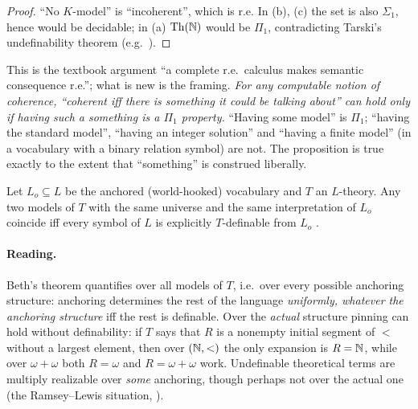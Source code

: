 \begin{proof}
``No $K$-model'' is ``incoherent'', which is r.e. In (b), (c) the set is also $\Sigma_1$, hence would be decidable; in (a) $\mathrm{Th}(\mathbb{N})$ would be $\Pi_1$, contradicting Tarski's undefinability theorem (e.g.\ \citealt{boolos2007computability}).
\end{proof}

This is the textbook argument ``a complete r.e.\ calculus makes semantic consequence r.e.''; what is new is the framing. \emph{For any computable notion of coherence, ``coherent iff there is something it could be talking about'' can hold only if having such a something is a $\Pi_1$ property.} ``Having some model'' is $\Pi_1$; ``having the standard model'', ``having an integer solution'' and ``having a finite model'' (in a vocabulary with a binary relation symbol) are not. The proposition is true exactly to the extent that ``something'' is construed liberally.

\begin{proposition}\label{prop:existence:beth}
Let $L_o\subseteq L$ be the anchored (world-hooked) vocabulary and $T$ an $L$-theory. Any two models of $T$ with the same universe and the same interpretation of $L_o$ coincide iff every symbol of $L$ is explicitly $T$-definable from $L_o$ \citep{beth1953padoa}.
\end{proposition}

\paragraph{Reading.} Beth's theorem quantifies over all models of $T$, i.e.\ over every possible anchoring structure: anchoring determines the rest of the language \emph{uniformly, whatever the anchoring structure} iff the rest is definable. Over the \emph{actual} structure pinning can hold without definability: if $T$ says that $R$ is a nonempty initial segment of $<$ without a largest element, then over $(\mathbb{N},<)$ the only expansion is $R=\mathbb{N}$, while over $\omega+\omega$ both $R=\omega$ and $R=\omega+\omega$ work. Undefinable theoretical terms are multiply realizable over \emph{some} anchoring, though perhaps not over the actual one (the Ramsey--Lewis situation, \citealt{lewis1970how}).

